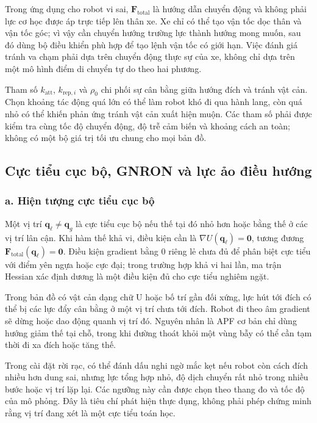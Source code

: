 \documentclass[12pt,a4paper,oneside]{report}
\begin{document}
Trong ứng dụng cho robot vi sai, \(\mathbf{F}_{\mathrm{total}}\) là hướng dẫn chuyển động và không phải lực cơ học được áp trực tiếp lên thân xe. Xe chỉ có thể tạo vận tốc dọc thân và vận tốc góc; vì vậy cần chuyển hướng trường lực thành hướng mong muốn, sau đó dùng bộ điều khiển phù hợp để tạo lệnh vận tốc có giới hạn. Việc đánh giá tránh va chạm phải dựa trên chuyển động thực sự của xe, không chỉ dựa trên một mô hình điểm di chuyển tự do theo hai phương.

Tham số \(k_{\mathrm{att}}\), \(k_{\mathrm{rep},i}\) và \(\rho_0\) chi phối sự cân bằng giữa hướng đích và tránh vật cản. Chọn khoảng tác động quá lớn có thể làm robot khó đi qua hành lang, còn quá nhỏ có thể khiến phản ứng tránh vật cản xuất hiện muộn. Các tham số phải được kiểm tra cùng tốc độ chuyển động, độ trễ cảm biến và khoảng cách an toàn; không có một bộ giá trị tối ưu chung cho mọi bản đồ.

\subsection{Cực tiểu cục bộ, GNRON và lực ảo điều hướng}

\subsubsection*{a. Hiện tượng cực tiểu cục bộ}

Một vị trí \(\mathbf{q}_{\ell}\neq\mathbf{q}_g\) là cực tiểu cục bộ nếu thế tại đó nhỏ hơn hoặc bằng thế ở các vị trí lân cận. Khi hàm thế khả vi, điều kiện cần là \(\nabla U(\mathbf{q}_{\ell})=\mathbf{0}\), tương đương \(\mathbf{F}_{\mathrm{total}}(\mathbf{q}_{\ell})=\mathbf{0}\). Điều kiện gradient bằng \(0\) riêng lẻ chưa đủ để phân biệt cực tiểu với điểm yên ngựa hoặc cực đại; trong trường hợp khả vi hai lần, ma trận Hessian xác định dương là một điều kiện đủ cho cực tiểu nghiêm ngặt.

Trong bản đồ có vật cản dạng chữ U hoặc bố trí gần đối xứng, lực hút tới đích có thể bị các lực đẩy cân bằng ở một vị trí chưa tới đích. Robot đi theo âm gradient sẽ dừng hoặc dao động quanh vị trí đó. Nguyên nhân là APF cơ bản chỉ dùng hướng giảm thế tại chỗ, trong khi đường thoát khỏi một vùng bẫy có thể cần tạm thời đi xa đích hoặc tăng thế.

Trong cài đặt rời rạc, có thể đánh dấu nghi ngờ mắc kẹt nếu robot còn cách đích nhiều hơn dung sai, nhưng lực tổng hợp nhỏ, độ dịch chuyển rất nhỏ trong nhiều bước hoặc vị trí lặp lại. Các ngưỡng này cần được chọn theo thang đo và tốc độ của mô phỏng. Đây là tiêu chí phát hiện thực dụng, không phải phép chứng minh rằng vị trí đang xét là một cực tiểu toán học.
\end{document}
